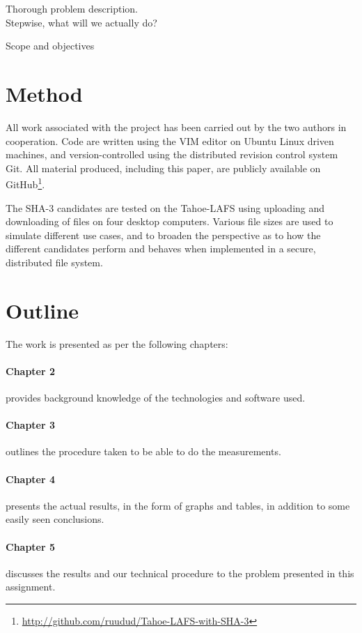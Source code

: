 \documentclass[english,12pt,a4paper]{book}
\begin{document}
Thorough problem description. \\
Stepwise, what will we actually do?

Scope and objectives

\section{Method}

All work associated with the project has been carried out by the two authors in
cooperation. Code are written using the VIM editor on Ubuntu Linux
driven machines, and version-controlled using the distributed revision control
system Git. All material produced, including this paper, are publicly available
on GitHub\footnote{\url{http://github.com/ruudud/Tahoe-LAFS-with-SHA-3}}.

The \ac{SHA}-3 candidates are tested on the Tahoe-\ac{LAFS} using uploading and
downloading of files on four desktop computers. Various file sizes are used to
simulate different use cases, and to broaden the perspective as to how the
different candidates perform and behaves when implemented in a secure,
distributed file system.

\section{Outline}

The work is presented as per the following chapters:

\paragraph{Chapter 2} provides background knowledge of the technologies and
software used.

\paragraph{Chapter 3} outlines the procedure taken to be able to do the
measurements.

\paragraph{Chapter 4} presents the actual results, in the form of graphs and
tables, in addition to some easily seen conclusions.

\paragraph{Chapter 5} discusses the results and our technical procedure to the
problem presented in this assignment.
\end{document}
